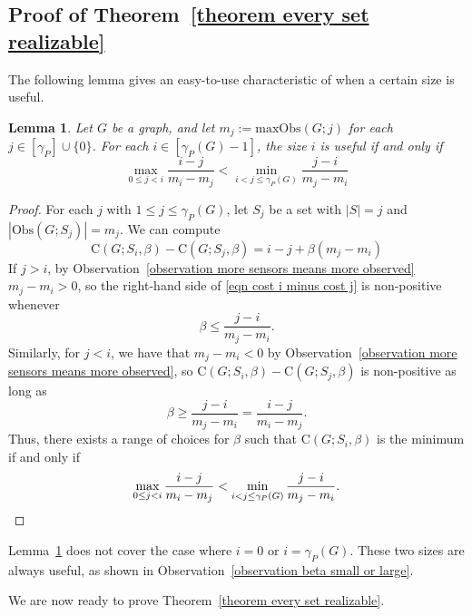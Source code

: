 \documentclass{article}
\newtheorem{lemma}[theorem]{Lemma}
\begin{document}
    \subsection{Proof of \texorpdfstring{Theorem~\ref{theorem every set realizable}}{Theorem 2.7}}\label{subsection final proof grid gadgets}
        The following lemma gives an easy-to-use characteristic of when a certain size is useful.
        \begin{lemma}\label{lemma characterization of beta good sizes}
            Let $G$ be a graph, and let $m_j:=\mathrm{maxObs}(G;j)$ for each $j\in [\gamma_P]\cup\{0\}$.
            For each $i\in [\gamma_P(G)-1]$, the size $i$ is useful if and only if
                \[ 
                \max_{0\leq j<i}\frac{i-j}{m_i-m_j}< \min_{i<j\leq \gamma_P(G)}\frac{j-i}{m_j-m_i}
                 \]
        \end{lemma}
        \begin{proof}
            For each $j$ with $1\leq j\leq \gamma_P(G)$, let $S_j$ be a set with $|S|=j$ and $|\mathrm{Obs}(G;S_j)|=m_j$.
            We can compute
                \begin{equation}\label{eqn cost i minus cost j} \mathrm{C}(G;S_i,\beta)-\mathrm{C}(G;S_j,\beta)=i-j+\beta(m_j-m_i)
                \end{equation}
            If $j>i$, by Observation~\ref{observation more sensors means more observed} $m_j - m_i > 0$, so the right-hand side of \eqref{eqn cost i minus cost j} is non-positive whenever 
                \[ \beta\leq \frac{j-i}{m_j-m_i}. \] 
            Similarly, for $j<i$, we have that $m_j-m_i<0$ by Observation~\ref{observation more sensors means more observed}, so $\mathrm{C}(G;S_i,\beta)-\mathrm{C}(G;S_j,\beta)$ is non-positive as long as
                \[ \beta\geq \frac{j-i}{m_j-m_i}=\frac{i-j}{m_i-m_j}. \] 
            Thus, there exists a range of choices for $\beta$ such that $\mathrm{C}(G;S_i,\beta)$ is the minimum if and only if
                \[ \max_{0\leq j<i}\frac{i-j}{m_i-m_j}< \min_{i<j\leq \gamma_P(G)}\frac{j-i}{m_j-m_i}.\qedhere \] 
        \end{proof}
        
        Lemma~\ref{lemma characterization of beta good sizes} does not cover the case where $i=0$ or $i=\gamma_P(G)$.
        These two sizes are always useful, as shown in Observation~\ref{observation beta small or large}.

        We are now ready to prove Theorem~\ref{theorem every set realizable}.
        
\end{document}
